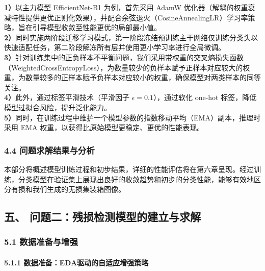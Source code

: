 \documentclass[
]{article}
\begin{document}
\textbf{1）}以主力模型 EfficientNet-B1 为例，首先采用 AdamW
优化器（解耦的权重衰减特性提供更优正则化效果），并配合余弦退火（CosineAnnealingLR）学习率策略，旨在引导模型收敛至性能更优的局部最小值。\\
\textbf{2）}同时实施两阶段迁移学习模式，第一阶段冻结预训练主干网络仅训练分类头以快速适配任务，第二阶段解冻所有层并使用更小学习率进行全局微调。\\
\textbf{3）}针对训练集中的正负样本不平衡问题，我们采用带权重的交叉熵损失函数
（WeightedCrossEntropyLoss），为数量较少的负样本赋予正样本对应较大的权重，为数量较多的正样本赋予负样本对应较小的权重，确保模型对两类样本的同等关注。\\
\textbf{4）}此外，通过标签平滑技术（平滑因子
\(\epsilon = 0.1\)），通过软化 one-hot
标签，降低模型过拟合风险，提升泛化能力。\\
\textbf{5）}同时，在训练过程中维护一个模型参数的指数移动平均（EMA）副本，推理时采用
EMA 权重，以获得比原始模型更稳定、更优的性能表现。

\subsubsection{\texorpdfstring{\textbf{4.4
问题求解结果与分析}}{4.4 问题求解结果与分析}}\label{44-ux95eeux9898ux6c42ux89e3ux7ed3ux679cux4e0eux5206ux6790}

本部分将概述模型训练过程和初步结果，详细的性能评估将在第六章呈现。经过训练，分类模型在验证集上展现出良好的收敛趋势和初步的分类性能，能够有效地区分有损和我们生成的无损集装箱图像。

\subsection{\texorpdfstring{\textbf{五、
问题二：残损检测模型的建立与求解}}{五、 问题二：残损检测模型的建立与求解}}\label{ux4e94-ux95eeux9898ux4e8cux6b8bux635fux68c0ux6d4bux6a21ux578bux7684ux5efaux7acbux4e0eux6c42ux89e3}

\subsubsection{\texorpdfstring{\textbf{5.1
数据准备与增强}}{5.1 数据准备与增强}}\label{51-ux6570ux636eux51c6ux5907ux4e0eux589eux5f3a}

\paragraph{\texorpdfstring{\textbf{5.1.1
}数据准备：EDA驱动的自适应增强策略}{5.1.1 数据准备：EDA驱动的自适应增强策略}}\label{511-ux6570ux636eux51c6ux5907edaux9a71ux52a8ux7684ux81eaux9002ux5e94ux589eux5f3aux7b56ux7565}
\end{document}
